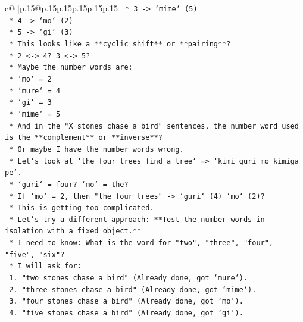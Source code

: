 \documentclass{article}
\begin{document}
{\begin{supertabular}{c@{$\;$}|p{.15\linewidth}@{}p{.15\linewidth}p{.15\linewidth}p{.15\linewidth}p{.15\linewidth}p{.15\linewidth}}
{{{\texttt{                *   3 {-}> `mime` (5)} \\
\texttt{                *   4 {-}> `mo` (2)} \\
\texttt{                *   5 {-}> `gi` (3)} \\
\texttt{                *   This looks like a **cyclic shift** or **pairing**?} \\
\texttt{                *   2 <{-}> 4? 3 <{-}> 5?} \\
\texttt{                *   Maybe the number words are:} \\
\texttt{                    *   `mo` = 2} \\
\texttt{                    *   `mure` = 4} \\
\texttt{                    *   `gi` = 3} \\
\texttt{                    *   `mime` = 5} \\
\texttt{                *   And in the "X stones chase a bird" sentences, the number word used is the **complement** or **inverse**?} \\
\texttt{                *   Or maybe I have the number words wrong.} \\
\texttt{                *   Let's look at `the four trees find a tree` => `kimi guri mo kimiga pe`.} \\
\texttt{                    *   `guri` = four? `mo` = the?} \\
\texttt{                    *   If `mo` = 2, then "the four trees" {-}> `guri` (4) `mo` (2)?} \\
\texttt{                *   This is getting too complicated.} \\
\texttt{                *   Let's try a different approach: **Test the number words in isolation with a fixed object.**} \\
\texttt{                *   I need to know: What is the word for "two", "three", "four", "five", "six"?} \\
\texttt{                *   I will ask for:} \\
\texttt{                    1.  "two stones chase a bird" (Already done, got `mure`).} \\
\texttt{                    2.  "three stones chase a bird" (Already done, got `mime`).} \\
\texttt{                    3.  "four stones chase a bird" (Already done, got `mo`).} \\
\texttt{                    4.  "five stones chase a bird" (Already done, got `gi`).} \\
}}}
\end{supertabular}}
\end{document}
